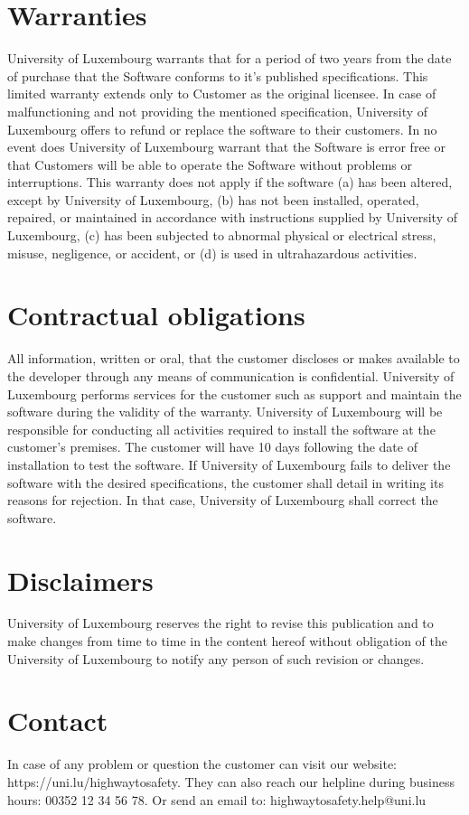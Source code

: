 \section{Warranties}
University of Luxembourg warrants that for a period of two years from the date
of purchase that the Software conforms to it's published specifications. This
limited warranty extends only to Customer as the original licensee. In case of
malfunctioning and not providing the mentioned specification, University of
Luxembourg offers to refund or replace the software to their customers. In no
event does University of Luxembourg warrant that the Software is error free or
that Customers will be able to operate the Software without problems or
interruptions. This warranty does not apply if the software (a) has been
altered, except by University of Luxembourg, (b) has not been installed,
operated, repaired, or maintained in accordance with instructions supplied by
University of Luxembourg, (c) has been subjected to abnormal physical or
electrical stress, misuse, negligence, or accident, or (d) is used in
ultrahazardous activities.

\section{Contractual obligations}
All information, written or oral, that the customer discloses or makes available
to the developer through any means of communication is confidential.
University of Luxembourg performs services for the customer such as support and
maintain the software during the validity of the warranty.
University of Luxembourg will be responsible for conducting all activities
required to install the software at the customer's premises.
The customer will have 10 days following the date of installation to test the
software.
If University of Luxembourg fails to deliver the software with the desired
specifications, the customer shall detail in writing its reasons for rejection.
In that case, University of Luxembourg shall correct the software.

\section{Disclaimers}
University of Luxembourg reserves the right to revise this publication and to
make changes from time to time in the content hereof without obligation of the
University of Luxembourg to notify any person of such revision or changes.

\section{Contact}
In case of any problem or question the customer can visit our website:
https://uni.lu/highwaytosafety.                                                 
They can also reach our helpline during business hours: 00352 12 34 56 78.      
Or send an email to: highwaytosafety.help@uni.lu